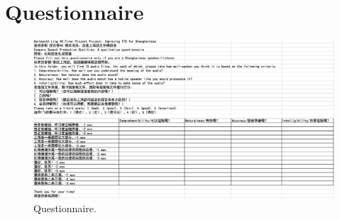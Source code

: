\documentclass[11pt]{article}
\begin{document}
\section{Questionnaire}
\begin{figure}[H]
    \centering
    \includegraphics[width=0.6\paperwidth]{questionnaire.png}
    \caption{Questionnaire.\label{fig:questionnaire}}
\end{figure}
\end{document}
